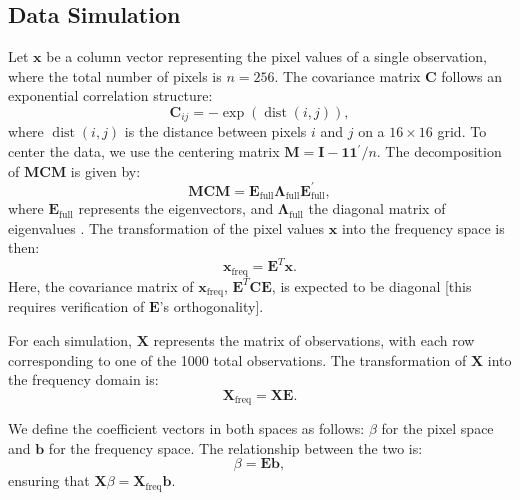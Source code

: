 \documentclass[12pt]{article}
\begin{document}
\subsection*{Data Simulation}

Let \( \mathbf{x} \) be a column vector representing the pixel values of a single observation, where the total number of pixels is \( n = 256 \). The covariance matrix \( \mathbf{C} \) follows an exponential correlation structure:
\[
\mathbf{C}_{ij} = -\exp(\operatorname{dist}(i,j)),
\]
where \( \operatorname{dist}(i,j) \) is the distance between pixels \( i \) and \( j \) on a \( 16 \times 16 \) grid. To center the data, we use the centering matrix \( \mathbf{M} = \mathbf{I} - \mathbf{1} \mathbf{1}^{\prime} / n \). The decomposition of \( \mathbf{MCM} \) is given by:
\[
\mathbf{MCM} = \mathbf{E}_{\text{full}} \mathbf{\Lambda}_{\text{full}} \mathbf{E}_{\text{full}}^{\prime},
\]
where \( \mathbf{E}_{\text{full}} \) represents the eigenvectors, and \( \mathbf{\Lambda}_{\text{full}} \) the diagonal matrix of eigenvalues \cite{murakami2019eigenvector}. The transformation of the pixel values \( \mathbf{x} \) into the frequency space is then:
\[
\mathbf{x}_{\text{freq}} = \mathbf{E}^T \mathbf{x}.
\]
Here, the covariance matrix of \( \mathbf{x}_{\text{freq}} \), \( \mathbf{E}^T \mathbf{C} \mathbf{E} \), is expected to be diagonal [this requires verification of \( \mathbf{E} \)'s orthogonality].

For each simulation, \( \mathbf{X} \) represents the matrix of observations, with each row corresponding to one of the 1000 total observations. The transformation of \( \mathbf{X} \) into the frequency domain is:
\[
\mathbf{X}_{\mathrm{freq}} = \mathbf{X} \mathbf{E}.
\]

We define the coefficient vectors in both spaces as follows: \( \beta \) for the pixel space and \( \mathbf{b} \) for the frequency space. The relationship between the two is:
\[
\beta = \mathbf{E} \mathbf{b},
\]
ensuring that \( \mathbf{X} \beta = \mathbf{X}_{\mathrm{freq}} \mathbf{b} \).
\end{document}
